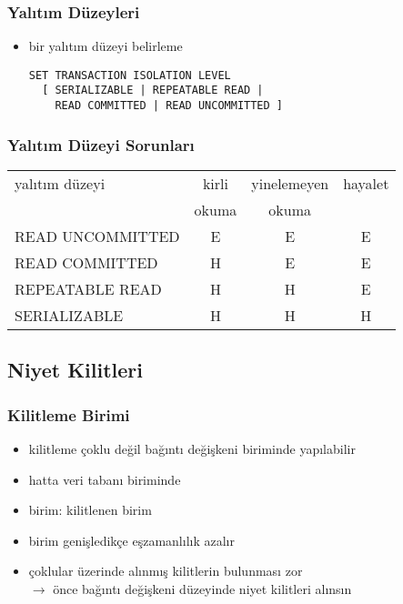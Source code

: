 \documentclass[dvipsnames]{beamer}
\theoremstyle{plain}
\begin{document}
\begin{frame}[fragile]
  \frametitle{Yalıtım Düzeyleri}

  \begin{itemize}
    \item bir yalıtım düzeyi belirleme
    \begin{lstlisting}
SET TRANSACTION ISOLATION LEVEL
  [ SERIALIZABLE | REPEATABLE READ |
    READ COMMITTED | READ UNCOMMITTED ]
    \end{lstlisting}
  \end{itemize}
\end{frame}

\begin{frame}[fragile]
  \frametitle{Yalıtım Düzeyi Sorunları}

  \begin{table}
    \begin{tabular}{|l||c|c|c|}\hline
yalıtım düzeyi   & kirli & yinelemeyen & hayalet\\
                 & okuma & okuma       &        \\\hline\hline
READ UNCOMMITTED & E     & E           & E      \\\hline
READ COMMITTED   & H     & E           & E      \\\hline
REPEATABLE READ  & H     & H           & E      \\\hline
SERIALIZABLE     & H     & H           & H      \\\hline
    \end{tabular}
  \end{table}
\end{frame}

\subsection{Niyet Kilitleri}

\begin{frame}
  \frametitle{Kilitleme Birimi}

  \begin{itemize}
    \item kilitleme çoklu değil bağıntı değişkeni biriminde yapılabilir
    \item hatta veri tabanı biriminde

    \medskip
    \item birim: kilitlenen birim    
    \item birim genişledikçe eşzamanlılık azalır

    \pause
    \medskip
    \item çoklular üzerinde alınmış kilitlerin bulunması zor\\
      $\rightarrow$ önce bağıntı değişkeni düzeyinde \alert{niyet kilitleri}
      alınsın
  \end{itemize}
\end{frame}
\end{document}
